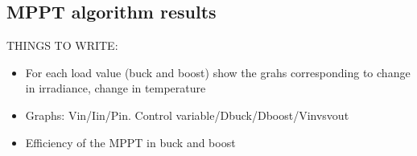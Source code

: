 \subsection{MPPT algorithm results}

THINGS TO WRITE:
\begin{itemize}
	\item For each load value (buck and boost) show the grahs corresponding to change in irradiance, change in temperature 
	\item Graphs: Vin/Iin/Pin. Control variable/Dbuck/Dboost/Vinvsvout
	\item Efficiency of the MPPT in buck and boost
	
\end{itemize}
